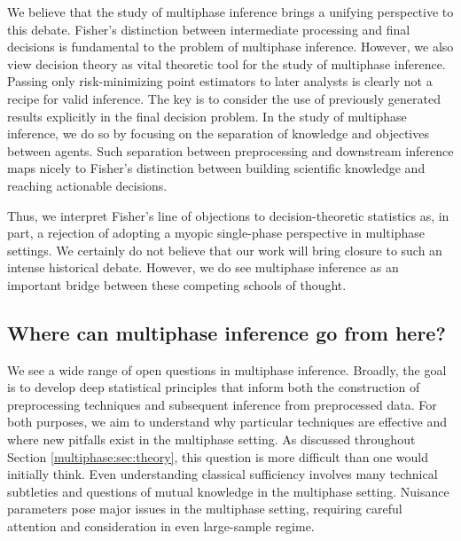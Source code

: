 We believe that the study of multiphase inference brings a unifying perspective to this debate.
Fisher's distinction between intermediate processing and final decisions is fundamental to the problem of multiphase inference.
However, we also view decision theory as vital theoretic tool for the study of multiphase inference.
Passing only risk-minimizing point estimators to later analysts is clearly not a recipe for valid inference.
The key is to consider the use of previously generated results explicitly in the final decision problem.
In the study of multiphase inference, we do so by focusing on the separation of knowledge and objectives between agents.
Such separation between preprocessing and downstream inference maps nicely to Fisher's distinction between building scientific knowledge and reaching actionable decisions.

Thus, we interpret Fisher's line of objections to decision-theoretic statistics as, in part, a rejection of adopting a myopic single-phase perspective in multiphase settings.
We certainly do not believe that our work will bring closure to such an intense historical debate.
However, we do see multiphase inference as an important bridge between these competing schools of thought.

\subsection{Where can multiphase inference go from here?}
\label{multiphase:sec:future}

We see a wide range of open questions in multiphase inference.
Broadly, the goal is to develop deep statistical principles that inform both the construction of preprocessing techniques and subsequent inference from preprocessed data.
For both purposes, we aim to understand why particular techniques are effective and where new pitfalls exist in the multiphase setting.
As discussed throughout Section \ref{multiphase:sec:theory}, this question is more difficult than one would initially think.
Even understanding classical sufficiency involves many technical subtleties and questions of mutual knowledge in the multiphase setting.
Nuisance parameters pose major issues in the multiphase setting, requiring careful attention and consideration in even large-sample regime.

